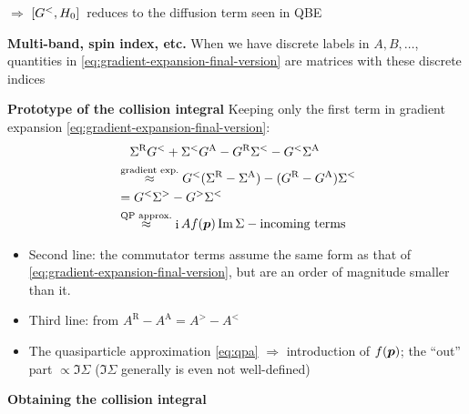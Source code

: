 \documentclass[t]{beamer}
\DeclareMathOperator{\ii}{i}
\begin{document}
\begin{frame}[allowframebreaks]
$\Rightarrow$ $\comm*{G^<}{H_0}$ reduces to the diffusion term seen in QBE

\vspace{0.25cm}

\textbf{Multi-band, spin index, etc.} When we have discrete labels in $A, B, \dots$,
quantities in \eqref{eq:gradient-expansion-final-version} 
are matrices with these discrete indices

\framebreak

\textbf{Prototype of the collision integral}
Keeping only the first term in gradient expansion \eqref{eq:gradient-expansion-final-version}:
\begin{equation}
    \begin{aligned}
        &\quad \Sigma^{\text{R}} G^< + \Sigma^< G^{\text{A}} - G^{\text{R}} \Sigma^< - G^< \Sigma^{\text{A}}\\
        &\stackrel{\text{gradient exp.}}{\approx} G^<(\Sigma^{\text{R}} - \Sigma^{\text{A}}) 
        - (G^{\text{R}} - G^{\text{A}}) \Sigma^< \\
        &= G^< \Sigma^> - G^> \Sigma^< \\
        &\stackrel{\text{QP approx.}}{\approx}  \ii A f (\vb*{p}) \Im \Sigma
        - \text{incoming terms} 
    \end{aligned}
\end{equation}    
\begin{itemize}
    \item Second line: the commutator terms assume  
    the same form as that of \eqref{eq:gradient-expansion-final-version},
    but are an order of magnitude smaller than it.
    \item Third line: from $A^{\text{R}} - A^{\text{A}} = A^> - A^<$
    \item The quasiparticle approximation \eqref{eq:qpa} $\Rightarrow$ introduction of $f(\vb*{p})$;
    the ``out'' part $\propto \Im \Sigma$
    ($\Im \Sigma$ generally is even not well-defined)
\end{itemize}

\framebreak

\textbf{Obtaining the collision integral} 


\end{frame}
\end{document}
